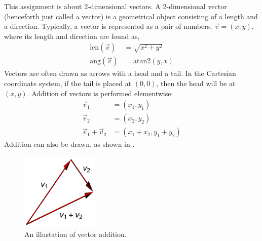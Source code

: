 This assignment is about 2-dimensional vectors. A 2-dimensional vector
(henceforth just called a vector) is a geometrical object consisting
of a length and a direction. Typically, a vector is represented as
a pair of numbers, $\vec v  = (x, y)$, where its length and direction
are found as,
\begin{align}
  \text{len}(\vec v) &= \sqrt{x^2+y^2}
  \\\text{ang}(\vec v) &=\text{atan2}(y, x)
\end{align}
Vectors are often drawn as arrows with a head and a tail. In the
Cartesian coordinate system, if the tail is placed at $(0, 0)$, then
the head will be at $(x, y)$. Addition of vectors is performed
elementwise:
\begin{align}
  \vec v_1 &= (x_1, y_1)
  \\\vec v_2 &= (x_2, y_2)
  \\\vec v_1 + \vec v_2 &= (x_1+x_2, y_1+y_2)
\end{align}
Addition can also be drawn, as shown in .
\begin{figure}[h]
  \centering
  \includegraphics[width=0.33\textwidth]{vectorAddition}
  \caption{An illustation of vector addition.}
  \label{fig:vectorAddition}
\end{figure}
